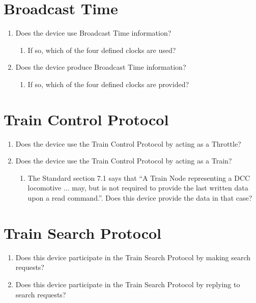 \section{Broadcast Time}
    \begin{enumerate}
        \item Does the device use Broadcast Time information?
            \begin{enumerate}
                \item If so, which of the four defined clocks are used?
            \end{enumerate}
        \item Does the device produce Broadcast Time information?
            \begin{enumerate}
                \item If so, which of the four defined clocks are provided?
            \end{enumerate}
        
    \end{enumerate}

\section{Train Control Protocol}
    \begin{enumerate}
        \item Does the device use the Train Control Protocol by acting as a Throttle?
        \item Does the device use the Train Control Protocol by acting as a Train?
        \begin{enumerate}
            \item The Standard section 7.1 says that
                ``A Train Node representing a DCC locomotive ... may, 
                but is not required to provide the last written data upon a read command.''.
                Does this device provide the data in that case?
        \end{enumerate}
    \end{enumerate}

\section{Train Search Protocol}
    \begin{enumerate}
        \item Does this device participate in the Train Search Protocol
            by making search requests?
        \item Does this device participate in the Train Search Protocol
            by replying to search requests?
    \end{enumerate}

